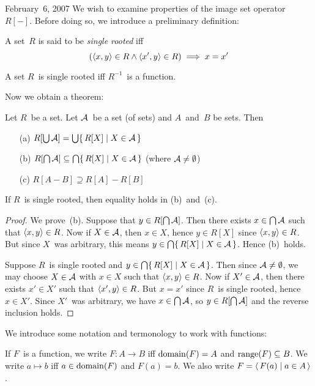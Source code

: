 \begin{lecture}{February~6, 2007}
We wish to examine properties of the image set operator~\(R[-]\). Before doing so, we introduce a preliminary definition:
\begin{defn}
A set~\(R\) is said to be \emph{single rooted} iff
\[(\langle{x},{y}\rangle\in R\land\langle{x'},{y}\rangle\in R)\implies x=x'\]
\end{defn}
\begin{prop}
A set \(R\)~is single rooted iff \(R^{-1}\)~is a function.
\end{prop}
\noindent Now we obtain a theorem:
\begin{thm}
Let \(R\)~be a set. Let \(\mathcal{A}\)~be a set (of sets) and \(A\)~and~\(B\) be sets. Then
\begin{enumerate}[itemsep=0pt]
\item[(a)] \(R[\bigcup\mathcal{A}]=\bigcup\{\,R[X]\mid X\in\mathcal{A}\,\}\)
\item[(b)] \(R[\bigcap\mathcal{A}]\subseteq\bigcap\{\,R[X]\mid X\in\mathcal{A}\,\}\) (where \(\mathcal{A}\ne\emptyset\))
\item[(c)] \(R[A-B]\supseteq R[A]-R[B]\)
\end{enumerate}
If \(R\)~is single rooted, then equality holds in (b)~and~(c).
\end{thm}
\begin{proof}
We prove~(b). Suppose that \(y\in R[\bigcap\mathcal{A}]\). Then there exists \(x\in\bigcap\mathcal{A}\) such that \(\langle{x},{y}\rangle\in R\). Now if \(X\in\mathcal{A}\), then \(x\in X\), hence \(y\in R[X]\) since \(\langle{x},{y}\rangle\in R\). But since \(X\)~was arbitrary, this means \(y\in\bigcap\{\,R[X]\mid X\in\mathcal{A}\,\}\). Hence (b)~holds.

Suppose \(R\)~is single rooted and \(y\in\bigcap\{\,R[X]\mid X\in\mathcal{A}\,\}\). Then since \(\mathcal{A}\ne\emptyset\), we may choose \(X\in\mathcal{A}\) with \(x\in X\) such that \(\langle{x},{y}\rangle\in R\). Now if \(X'\in\mathcal{A}\), then there exists \(x'\in X'\) such that \(\langle{x'},{y}\rangle\in R\). But \(x=x'\) since \(R\)~is single rooted, hence \(x\in X'\). Since \(X'\)~was arbitrary, we have \(x\in\bigcap\mathcal{A}\), so \(y\in R[\bigcap\mathcal{A}]\) and the reverse inclusion holds.
\end{proof}

We introduce some notation and termonology to work with functions:
\begin{defn}
If \(F\)~is a function, we write \(F:A\to B\) iff \(\operatorname{domain}(F)=A\) and \(\operatorname{range}(F)\subseteq B\). We write \(a\mapsto b\) iff \(a\in\operatorname{domain}(F)\) and \(F(a)=b\). We also write \(F=\langle\,{F(a)}\mid{a\in A}\,\rangle\).


\end{defn}
\end{lecture}
